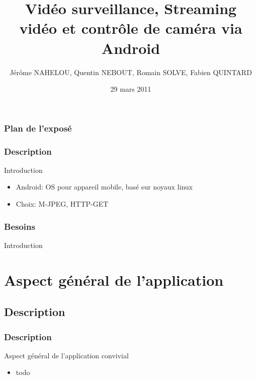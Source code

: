 \documentclass{beamer}
\title{Vidéo surveillance, Streaming vidéo et contrôle de caméra via Android }
\author{\tiny{Jérôme NAHELOU, Quentin NEBOUT, Romain SOLVE, Fabien QUINTARD}}
\institute{\large{Chargé de Projet : Yérom-David Bromberg}\\ \bigskip{}

\small{Université Bordeaux 1}}
\date{29 mars 2011}
\begin{document}
\frame[plain]{\titlepage}


\begin{frame}
\frametitle{Plan de l'exposé}
\small{\tableofcontents[hideallsubsections]}
\end{frame}


  \begin{frame}
   \frametitle{Description}
  Introduction
   \begin{itemize}
    \item Android: OS pour appareil mobile, basé sur noyaux linux
    \item Choix: M-JPEG, HTTP-GET
   \end{itemize}
  \end{frame}
  
  \begin{frame}
   \frametitle{Besoins}
  Introduction
  \end{frame}

\section{Aspect général de l'application}
  \subsection{Description}
  \begin{frame}
   \frametitle{Description}
  Aspect général de l'application convivial
   \begin{itemize}
   \item todo
   \end{itemize}
  \end{frame}

\end{document}
